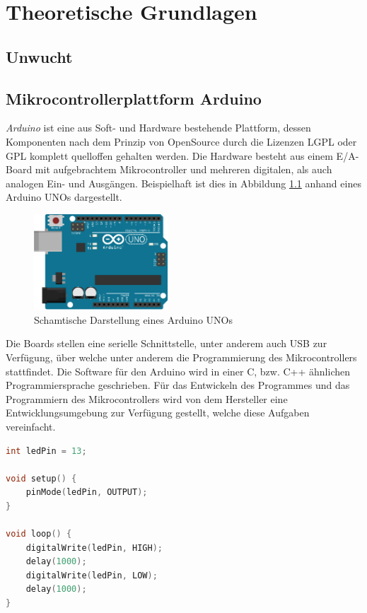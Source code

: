 
\chapter{Theoretische Grundlagen}

\section{Unwucht}

\section{Mikrocontrollerplattform Arduino}
\textit{Arduino} ist eine aus Soft- und Hardware bestehende Plattform, dessen Komponenten nach dem Prinzip von OpenSource durch die Lizenzen \ac{LGPL} oder \ac{GPL} komplett quelloffen gehalten werden.
Die Hardware besteht aus einem E/A-Board mit aufgebrachtem Mikrocontroller und mehreren digitalen, als auch analogen Ein- und Ausgängen.
Beispielhaft ist dies in Abbildung \ref{fig:arduino_uno_schema} anhand eines Arduino UNOs dargestellt.
\begin{figure}[H]
	\centering
	\includegraphics[width=5cm]{images/chapter/02/arduino_uno.png}
	\caption{Schamtische Darstellung eines Arduino UNOs}
	\label{fig:arduino_uno_schema}
\end{figure}
Die Boards stellen eine serielle Schnittstelle, unter anderem auch \ac{USB} zur Verfügung, über welche unter anderem die Programmierung des Mikrocontrollers stattfindet.
Die Software für den Arduino wird in einer C, bzw. C++ ähnlichen Programmiersprache geschrieben.
Für das Entwickeln des Programmes und das Programmiern des Mikrocontrollers wird von dem Hersteller eine Entwicklungsumgebung zur Verfügung gestellt, welche diese Aufgaben vereinfacht.

\begin{lstlisting}[language=C, label=arduino_sample_code, title=Beispiel-Code eines Blinklichtes für den Arduino]
int ledPin = 13;

void setup() {
    pinMode(ledPin, OUTPUT);
}

void loop() {
    digitalWrite(ledPin, HIGH);
    delay(1000);
    digitalWrite(ledPin, LOW);
    delay(1000);
}
\end{lstlisting}

